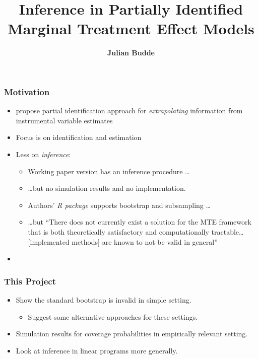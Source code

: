 \documentclass[11pt, aspectratio=169]{beamer}
\title{Inference in Partially Identified Marginal Treatment Effect Models}
\author[Julian Budde]{\bf Julian Budde}
\begin{document}
\begin{frame}
    \titlepage
    \note{~}
\end{frame}

\begin{frame}
    \frametitle{Motivation}

    \begin{itemize}
        \item \citet{mogstad2018using} propose partial identification approach for \textit{extrapolating} information from instrumental variable estimates
        \item Focus is on identification and estimation
        \item Less on \textit{inference}:
        \begin{itemize}
            \footnotesize
            \item Working paper version has an inference procedure \dots
            \item \dots but no simulation results and no implementation.
            \item Authors' \textit{R package} supports bootstrap and subsampling \dots
            \item \dots but ``There does not currently exist a solution for the MTE framework that is both theoretically
            satisfactory and computationally tractable\dots [implemented methods] are known to not be valid in general''
        \end{itemize}
        \item
    \end{itemize}

\end{frame}

\begin{frame}
    \frametitle{This Project}

    \begin{itemize}
        \item Show the standard bootstrap is invalid in simple setting.
        \begin{itemize}
            \item Suggest some alternative approaches for these settings.
        \end{itemize}
        \item Simulation results for coverage probabilities in empirically relevant setting.
        \item Look at inference in linear programs more generally.
    \end{itemize}

\end{frame}
\end{document}
